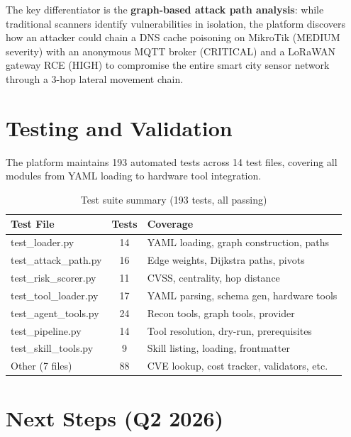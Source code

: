 \documentclass[11pt,a4paper]{article}
\begin{document}
The key differentiator is the \textbf{graph-based attack path analysis}: while traditional scanners identify vulnerabilities in isolation, the platform discovers how an attacker could chain a DNS cache poisoning on MikroTik (MEDIUM severity) with an anonymous MQTT broker (CRITICAL) and a LoRaWAN gateway RCE (HIGH) to compromise the entire smart city sensor network through a 3-hop lateral movement chain.

\section{Testing and Validation}

The platform maintains 193 automated tests across 14 test files, covering all modules from YAML loading to hardware tool integration.

\begin{table}[H]
\centering
\begin{tabular}{@{}lcp{6cm}@{}}
\toprule
\textbf{Test File} & \textbf{Tests} & \textbf{Coverage} \\
\midrule
test\_loader.py & 14 & YAML loading, graph construction, paths \\
test\_attack\_path.py & 16 & Edge weights, Dijkstra paths, pivots \\
test\_risk\_scorer.py & 11 & CVSS, centrality, hop distance \\
test\_tool\_loader.py & 17 & YAML parsing, schema gen, hardware tools \\
test\_agent\_tools.py & 24 & Recon tools, graph tools, provider \\
test\_pipeline.py & 14 & Tool resolution, dry-run, prerequisites \\
test\_skill\_tools.py & 9 & Skill listing, loading, frontmatter \\
Other (7 files) & 88 & CVE lookup, cost tracker, validators, etc. \\
\bottomrule
\end{tabular}
\caption{Test suite summary (193 tests, all passing)}
\label{tab:tests}
\end{table}

\section{Next Steps (Q2 2026)}
\end{document}
